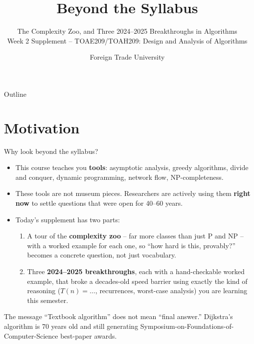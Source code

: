 \documentclass[11pt,aspectratio=169]{beamer}
\title{Beyond the Syllabus}
\subtitle{The Complexity Zoo, and Three 2024--2025 Breakthroughs in Algorithms\\
\small Week 2 Supplement -- TOAE209/TOAH209: Design and Analysis of Algorithms}
\author{Foreign Trade University}
\date{}
\begin{document}
\begin{frame}
  \titlepage
\end{frame}

\begin{frame}{Outline}
  \tableofcontents
\end{frame}

\section{Motivation}

\begin{frame}{Why look beyond the syllabus?}
  \begin{itemize}
    \item This course teaches you \textbf{tools}: asymptotic analysis, greedy algorithms,
    divide and conquer, dynamic programming, network flow, NP-completeness.
    \item These tools are not museum pieces. Researchers are actively using them
    \textbf{right now} to settle questions that were open for 40--60 years.
    \item Today's supplement has two parts:
    \begin{enumerate}
      \item A tour of the \textbf{complexity zoo} -- far more classes than just P and
      NP -- with a worked example for each one, so ``how hard is this, provably?''
      becomes a concrete question, not just vocabulary.
      \item Three \textbf{2024--2025 breakthroughs}, each with a hand-checkable
      worked example, that broke a decades-old speed barrier using exactly the kind
      of reasoning ($T(n) = \ldots$, recurrences, worst-case analysis) you are
      learning this semester.
    \end{enumerate}
  \end{itemize}
  \begin{alertblock}{The message}
    ``Textbook algorithm'' does not mean ``final answer.'' Dijkstra's algorithm is 70 years
    old and still generating Symposium-on-Foundations-of-Computer-Science best-paper awards.
  \end{alertblock}
\end{frame}
\end{document}
